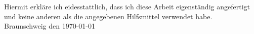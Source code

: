 

\vspace*{5cm}


Hiermit erkl\"are ich eidesstattlich, dass ich diese Arbeit eigenst\"andig angefertigt und keine anderen als die angegebenen Hilfsmittel verwendet habe.
\vspace{3cm}\\
Braunschweig den \today